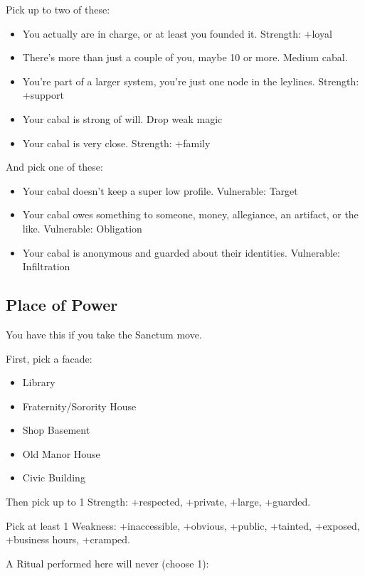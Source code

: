 \documentclass[
]{memoir}
\begin{document}
Pick up to two of these:

\begin{itemize}
\tightlist
\item
  You actually are in charge, or at least you founded it. Strength:
  +loyal
\item
  There's more than just a couple of you, maybe 10 or more. Medium
  cabal.
\item
  You're part of a larger system, you're just one node in the leylines.
  Strength: +support
\item
  Your cabal is strong of will. Drop weak magic
\item
  Your cabal is very close. Strength: +family
\end{itemize}

And pick one of these:

\begin{itemize}
\tightlist
\item
  Your cabal doesn't keep a super low profile. Vulnerable: Target
\item
  Your cabal owes something to someone, money, allegiance, an artifact,
  or the like. Vulnerable: Obligation
\item
  Your cabal is anonymous and guarded about their identities.
  Vulnerable: Infiltration
\end{itemize}

\hypertarget{place-of-power}{%
\subsection{Place of Power}\label{place-of-power}}

You have this if you take the Sanctum move.

First, pick a facade:

\begin{itemize}
\tightlist
\item
  Library
\item
  Fraternity/Sorority House
\item
  Shop Basement
\item
  Old Manor House
\item
  Civic Building
\end{itemize}

Then pick up to 1 Strength: +respected, +private, +large, +guarded.

Pick at least 1 Weakness: +inaccessible, +obvious, +public, +tainted,
+exposed, +business hours, +cramped.

A Ritual performed here will never (choose 1):
\end{document}
